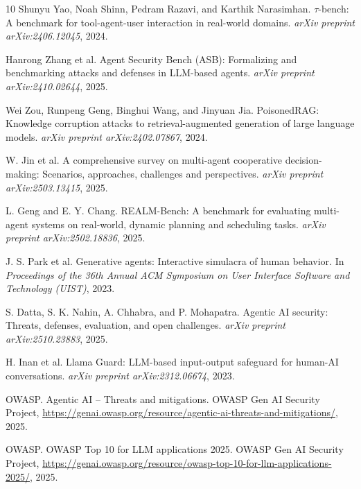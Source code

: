 \documentclass[11pt]{article}
\begin{document}
\begin{thebibliography}{10}
        Shunyu Yao, Noah Shinn, Pedram Razavi, and Karthik Narasimhan.
        \newblock $\tau$-bench: A benchmark for tool-agent-user interaction in real-world domains.
        \newblock \emph{arXiv preprint arXiv:2406.12045}, 2024.

        Hanrong Zhang et al.
        \newblock Agent Security Bench (ASB): Formalizing and benchmarking attacks and defenses in LLM-based agents.
        \newblock \emph{arXiv preprint arXiv:2410.02644}, 2025.

        Wei Zou, Runpeng Geng, Binghui Wang, and Jinyuan Jia.
        \newblock PoisonedRAG: Knowledge corruption attacks to retrieval-augmented generation of large language models.
        \newblock \emph{arXiv preprint arXiv:2402.07867}, 2024.

        W. Jin et al.
        \newblock A comprehensive survey on multi-agent cooperative decision-making: Scenarios, approaches, challenges and perspectives.
        \newblock \emph{arXiv preprint arXiv:2503.13415}, 2025.

        L. Geng and E. Y. Chang.
        \newblock REALM-Bench: A benchmark for evaluating multi-agent systems on real-world, dynamic planning and scheduling tasks.
        \newblock \emph{arXiv preprint arXiv:2502.18836}, 2025.

        J. S. Park et al.
        \newblock Generative agents: Interactive simulacra of human behavior.
        \newblock In \emph{Proceedings of the 36th Annual ACM Symposium on User Interface Software and Technology (UIST)}, 2023.

        S. Datta, S. K. Nahin, A. Chhabra, and P. Mohapatra.
        \newblock Agentic AI security: Threats, defenses, evaluation, and open challenges.
        \newblock \emph{arXiv preprint arXiv:2510.23883}, 2025.

        H. Inan et al.
        \newblock Llama Guard: LLM-based input-output safeguard for human-AI conversations.
        \newblock \emph{arXiv preprint arXiv:2312.06674}, 2023.

        OWASP.
        \newblock Agentic AI -- Threats and mitigations.
        \newblock OWASP Gen AI Security Project, \url{https://genai.owasp.org/resource/agentic-ai-threats-and-mitigations/}, 2025.

        OWASP.
        \newblock OWASP Top 10 for LLM applications 2025.
        \newblock OWASP Gen AI Security Project, \url{https://genai.owasp.org/resource/owasp-top-10-for-llm-applications-2025/}, 2025.

    \end{thebibliography}
\end{document}
